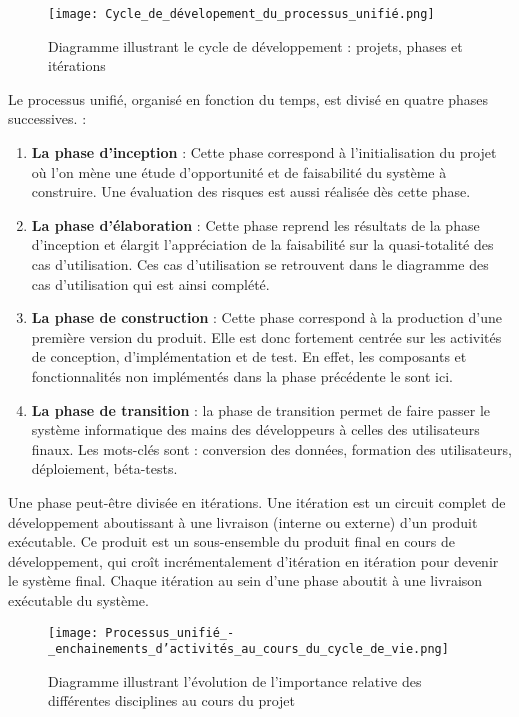             \begin{figure}[H]
                \centering
                \texttt{[image: Cycle\_de\_dévelopement\_du\_processus\_unifié.png]}
                \caption{Diagramme illustrant le cycle de développement :
                projets, phases et itérations}
                \label{fig:CycleDeDev}
            \end{figure}
            Le processus unifié, organisé en fonction du temps, est divisé en quatre phases
            successives. \cite{gabay2008uml} :
            \par
            \begin{enumerate}
                \setlength{\itemsep}{0pt}
                \item \textbf{La phase d'inception} : Cette phase correspond à l’initialisation du
                projet où l’on mène une étude d’opportunité et de faisabilité du système
                à construire. Une évaluation des risques est aussi réalisée dès cette phase.
                \item \textbf{La phase d’élaboration} : Cette phase reprend les résultats de
                la phase d'inception et élargit l’appréciation de la faisabilité sur la quasi-totalité
                des cas d’utilisation. Ces cas d’utilisation se retrouvent dans le diagramme
                des cas d’utilisation qui est ainsi complété.
                \item \textbf{La phase de construction} : Cette phase correspond à la production
                d’une première version du produit. Elle est donc fortement centrée sur les activités
                de conception, d’implémentation et de test. En effet, les composants et
                fonctionnalités non implémentés dans la phase précédente le sont ici.
                \item \textbf{La phase de transition} : la phase de transition permet de faire
                passer le système informatique des mains des développeurs à celles des utilisateurs finaux.
                Les mots-clés sont : conversion des données, formation des utilisateurs,
                déploiement, béta-tests. \cite{Roques2008}
            \end{enumerate}
            Une phase peut-être divisée en itérations. Une itération est un circuit complet de développement
            aboutissant à une livraison (interne ou externe) d’un produit exécutable.
            Ce produit est un sous-ensemble du produit final en cours de développement, qui
            croît incrémentalement d’itération en itération pour devenir le système final.
            Chaque itération au sein d’une phase aboutit à une livraison exécutable du système.
            \begin{figure}[H]
                \centering
                \texttt{[image: Processus\_unifié\_-\_enchainements\_d'activités\_au\_cours\_du\_cycle\_de\_vie.png]}
                \caption{Diagramme illustrant l’évolution de l’importance
                relative des différentes disciplines au cours du projet}
                \label{fig:UpsProfil}
            \end{figure}
            
